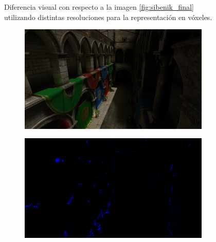 \begin{figure}[H]
\begin{subfigure}[b]{.49\linewidth}
	\end{subfigure}%
	\caption{Diferencia visual con respecto a la imagen \ref{fig:sibenik_final} utilizando distintas resoluciones para la representación en vóxeles.}
	\label{fig:sibenik_gi_resdiff}
\end{figure}

\begin{figure}[H]
	\centering
	\begin{subfigure}[b]{.49\linewidth}
		\centering
		\captionsetup{justification=centering}
		\includegraphics[width=\linewidth]{media/finals/sponza_gi_256.png}
	\end{subfigure}%
	\hspace{0.01\textwidth}
	\begin{subfigure}[b]{.49\linewidth}
		\centering
		\captionsetup{justification=centering}
		\includegraphics[width=\linewidth]{media/finals/sponza_gi_256_diff.png}
	\end{subfigure}%

\end{figure}

